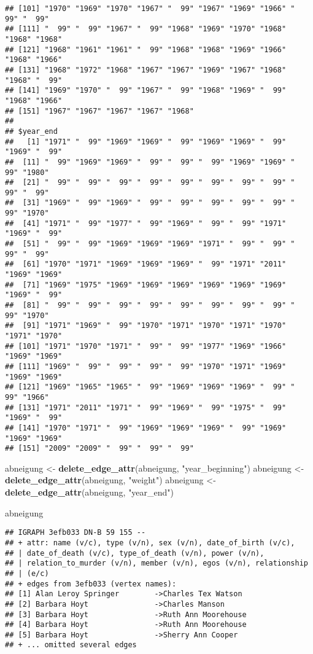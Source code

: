\documentclass[
]{article}
\newenvironment{Shaded}{\begin{snugshade}}{\end{snugshade}}
\newcommand{\KeywordTok}[1]{\textcolor[rgb]{0.13,0.29,0.53}{\textbf{#1}}}
\newcommand{\NormalTok}[1]{#1}
\newcommand{\StringTok}[1]{\textcolor[rgb]{0.31,0.60,0.02}{#1}}
\begin{document}
\begin{verbatim}
## [101] "1970" "1969" "1970" "1967" "  99" "1967" "1969" "1966" "  99" "  99"
## [111] "  99" "  99" "1967" "  99" "1968" "1969" "1970" "1968" "1968" "1968"
## [121] "1968" "1961" "1961" "  99" "1968" "1968" "1969" "1966" "1968" "1966"
## [131] "1968" "1972" "1968" "1967" "1967" "1969" "1967" "1968" "1968" "  99"
## [141] "1969" "1970" "  99" "1967" "  99" "1968" "1969" "  99" "1968" "1966"
## [151] "1967" "1967" "1967" "1967" "1968"
## 
## $year_end
##   [1] "1971" "  99" "1969" "1969" "  99" "1969" "1969" "  99" "1969" "  99"
##  [11] "  99" "1969" "1969" "  99" "  99" "  99" "1969" "1969" "  99" "1980"
##  [21] "  99" "  99" "  99" "  99" "  99" "  99" "  99" "  99" "  99" "  99"
##  [31] "1969" "  99" "1969" "  99" "  99" "  99" "  99" "  99" "  99" "1970"
##  [41] "1971" "  99" "1977" "  99" "1969" "  99" "  99" "1971" "1969" "  99"
##  [51] "  99" "  99" "1969" "1969" "1969" "1971" "  99" "  99" "  99" "  99"
##  [61] "1970" "1971" "1969" "1969" "1969" "  99" "1971" "2011" "1969" "1969"
##  [71] "1969" "1975" "1969" "1969" "1969" "1969" "1969" "1969" "1969" "  99"
##  [81] "  99" "  99" "  99" "  99" "  99" "  99" "  99" "  99" "  99" "1970"
##  [91] "1971" "1969" "  99" "1970" "1971" "1970" "1971" "1970" "1971" "1970"
## [101] "1971" "1970" "1971" "  99" "  99" "1977" "1969" "1966" "1969" "1969"
## [111] "1969" "  99" "  99" "  99" "  99" "1970" "1971" "1969" "1969" "1969"
## [121] "1969" "1965" "1965" "  99" "1969" "1969" "1969" "  99" "  99" "1966"
## [131] "1971" "2011" "1971" "  99" "1969" "  99" "1975" "  99" "1969" "  99"
## [141] "1970" "1971" "  99" "1969" "1969" "1969" "  99" "1969" "1969" "1969"
## [151] "2009" "2009" "  99" "  99" "  99"
\end{verbatim}

\begin{Shaded}
\begin{Highlighting}[]
\NormalTok{abneigung <-}\StringTok{ }\KeywordTok{delete_edge_attr}\NormalTok{(abneigung, }\StringTok{"year_beginning"}\NormalTok{)}
\NormalTok{abneigung <-}\StringTok{ }\KeywordTok{delete_edge_attr}\NormalTok{(abneigung, }\StringTok{"weight"}\NormalTok{)}
\NormalTok{abneigung <-}\StringTok{ }\KeywordTok{delete_edge_attr}\NormalTok{(abneigung, }\StringTok{"year_end"}\NormalTok{)}

\NormalTok{abneigung}
\end{Highlighting}
\end{Shaded}

\begin{verbatim}
## IGRAPH 3efb033 DN-B 59 155 -- 
## + attr: name (v/c), type (v/n), sex (v/n), date_of_birth (v/c),
## | date_of_death (v/c), type_of_death (v/n), power (v/n),
## | relation_to_murder (v/n), member (v/n), egos (v/n), relationship
## | (e/c)
## + edges from 3efb033 (vertex names):
## [1] Alan Leroy Springer        ->Charles Tex Watson 
## [2] Barbara Hoyt               ->Charles Manson     
## [3] Barbara Hoyt               ->Ruth Ann Moorehouse
## [4] Barbara Hoyt               ->Ruth Ann Moorehouse
## [5] Barbara Hoyt               ->Sherry Ann Cooper  
## + ... omitted several edges
\end{verbatim}
\end{document}
